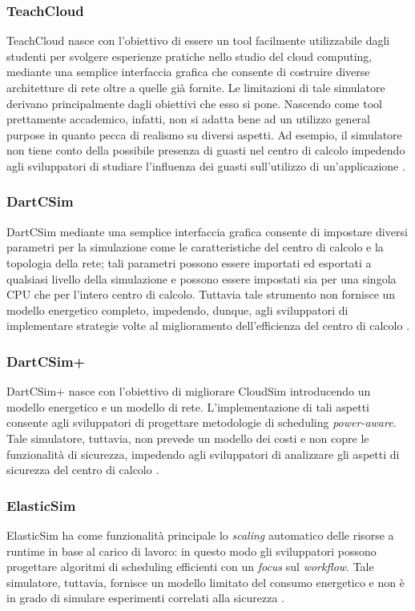 {\subsubsection*{TeachCloud}
TeachCloud \cite{jararweh2013teachcloud} nasce con l'obiettivo di essere un tool facilmente utilizzabile dagli studenti per svolgere esperienze pratiche nello studio del cloud computing, mediante una semplice interfaccia grafica che consente di costruire diverse architetture di rete oltre a quelle già fornite. Le limitazioni di tale simulatore derivano principalmente dagli obiettivi che esso si pone. Nascendo come tool prettamente accademico, infatti, non si adatta bene ad un utilizzo general purpose in quanto pecca di realismo su diversi aspetti. Ad esempio, il simulatore non tiene conto della possibile presenza di guasti nel centro di calcolo impedendo agli sviluppatori di studiare l'influenza dei guasti sull'utilizzo di un'applicazione \cite{mansouri2020cloud}. 
\subsubsection*{DartCSim}
DartCSim \cite{li2012dartcsim} mediante una semplice interfaccia grafica consente di impostare diversi parametri per la simulazione come le caratteristiche del centro di calcolo e la topologia della rete; tali parametri possono essere importati ed esportati a qualsiasi livello della simulazione e possono essere impostati sia per una singola CPU che per l'intero centro di calcolo. Tuttavia tale strumento non fornisce un modello energetico completo, impedendo, dunque, agli sviluppatori di implementare strategie volte al miglioramento dell'efficienza del centro di calcolo \cite{mansouri2020cloud}. 
\subsubsection*{DartCSim+}
DartCSim+ \cite{li2013dartcsim+} nasce con l'obiettivo di migliorare CloudSim introducendo un modello energetico e un modello di rete. L'implementazione di tali aspetti consente agli sviluppatori di progettare metodologie di scheduling \emph{power-aware}. Tale simulatore, tuttavia, non prevede un modello dei costi e non copre le funzionalità di sicurezza, impedendo agli sviluppatori di analizzare gli aspetti di sicurezza del centro di calcolo \cite{mansouri2020cloud}. 
\subsubsection*{ElasticSim}
ElasticSim \cite{cai2017elasticsim} ha come funzionalità principale lo \emph{scaling} automatico delle risorse a runtime in base al carico di lavoro: in questo modo gli sviluppatori possono progettare algoritmi di scheduling efficienti con un \emph{focus} sul \emph{workflow}. Tale simulatore, tuttavia, fornisce un modello limitato del consumo energetico e non è in grado di simulare esperimenti correlati alla sicurezza \cite{mansouri2020cloud}. 
}

